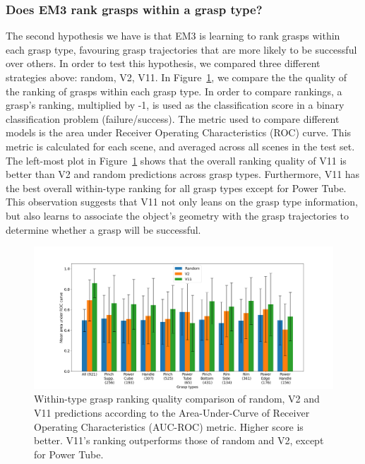 
\subsubsection{Does EM3 rank grasps within a grasp type?}
\noindent

The second hypothesis we have is that EM3 is learning to rank grasps within each grasp type, favouring grasp trajectories that are more likely to be successful over others. In order to test this hypothesis, we compared three different strategies above: random, V2, V11. In Figure~\ref{fig:post5}, we compare the the quality of the ranking of grasps within each grasp type. In order to compare rankings, a grasp's ranking, multiplied by -1, is used as the classification score in a binary classification problem (failure/success). The metric used to compare different models is the area under Receiver Operating Characteristics (ROC) curve. This metric is calculated for each scene, and averaged across all scenes in the test set. The left-most plot in Figure~\ref{fig:post5} shows that the overall ranking quality of V11 is better than V2 and random predictions across grasp types. Furthermore, V11 has the best overall within-type ranking for all grasp types except for Power Tube. This observation suggests that V11 not only leans on the grasp type information, but also learns to associate the object's geometry with the grasp trajectories to determine whether a grasp will be successful.

\begin{figure}
\centering
\includegraphics[width=0.999\columnwidth]{images/post-analysis/Ranking_quality_mean_AUC.png}
\caption{Within-type grasp ranking quality comparison of random, V2 and V11 predictions according to the Area-Under-Curve of Receiver Operating Characteristics (AUC-ROC) metric. Higher score is better. V11's ranking outperforms those of random and V2, except for Power Tube.}
\label{fig:post5}
\end{figure}

